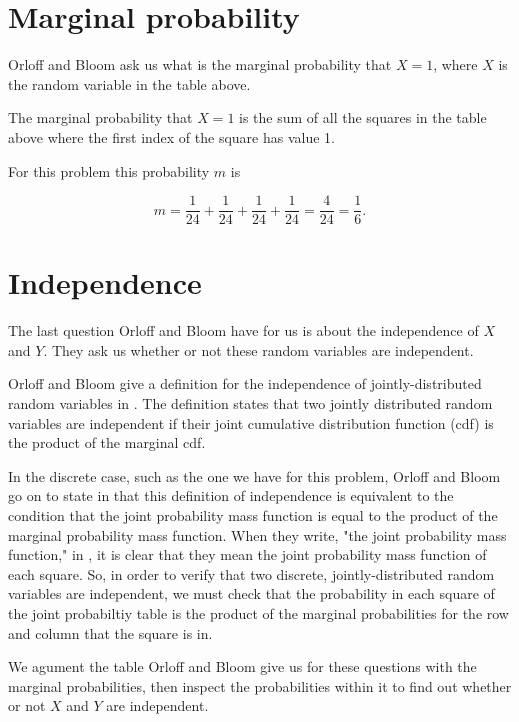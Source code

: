 \documentclass[a4paper,11pt]{article}
\begin{document}
\section{Marginal probability}

Orloff and Bloom ask us what is the marginal probability that $X=1$, where
$X$ is the random variable in the table above.

The marginal probability that $X=1$ is the sum of all the squares in the
table above where the first index of the square has value 1.

For this problem this probability $m$ is

\begin{equation}
 m = \frac{1}{24} + \frac{1}{24} + \frac{1}{24} + \frac{1}{24} = \frac{4}{24}
 = \frac{1}{6}.
\end{equation}

\section{Independence}

The last question Orloff and Bloom have for us is about the independence of
$X$ and $Y$.  They ask us whether or not these random variables are independent.

Orloff and Bloom give a definition for the independence of jointly-distributed
random variables in \cite{reading7}.  The definition states that two jointly
distributed random variables are independent if their joint cumulative
distribution function (cdf) is the product of the marginal cdf.

In the discrete case, such as the one we have for this problem, Orloff
and Bloom go on to state in \cite{reading7} that this definition of independence
is equivalent to the condition that the joint probability mass function is
equal to the product of the marginal probability mass function. When they
write, "the joint probability mass function," in \cite{reading7}, it is
clear that they mean the joint probability mass function of each square. So,
in order to verify that two discrete, jointly-distributed random variables
are independent, we must check that the probability in each square of the joint
probabiltiy table is the product of the marginal probabilities for the
row and column that the square is in.

We agument the table Orloff and Bloom give us for these questions with the
marginal probabilities, then inspect the probabilities within it to find
out whether or not $X$ and $Y$ are independent.
\end{document}

